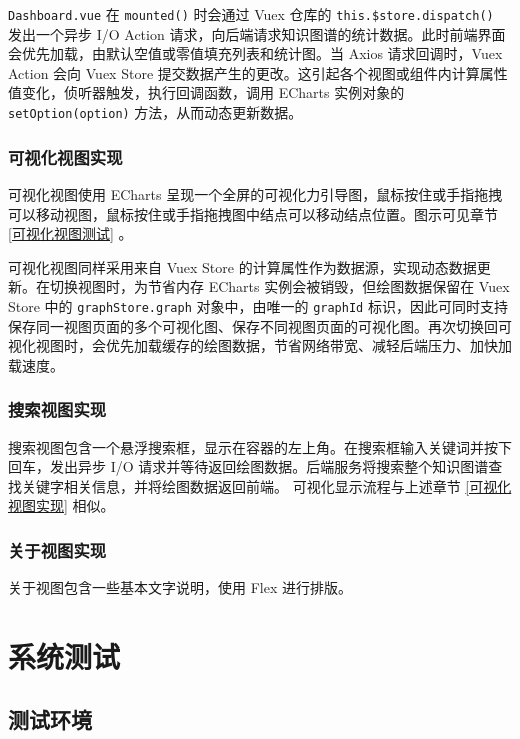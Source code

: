 \documentclass[a4paper,AutoFakeBold,oneside,12pt]{book}
\begin{document}
\lstinline|Dashboard.vue| 在 \lstinline|mounted()| 时会通过 Vuex 仓库的 \lstinline|this.$store.dispatch()| 发出一个异步 I/O Action 请求，向后端请求知识图谱的统计数据。此时前端界面会优先加载，由默认空值或零值填充列表和统计图。当 Axios 请求回调时，Vuex Action 会向 Vuex Store 提交数据产生的更改。这引起各个视图或组件内计算属性值变化，侦听器触发，执行回调函数，调用 ECharts 实例对象的 \lstinline|setOption(option)| 方法，从而动态更新数据。

\subsection{可视化视图实现\label{可视化视图实现}}

可视化视图使用 ECharts 呈现一个全屏的可视化力引导图，鼠标按住或手指拖拽可以移动视图，鼠标按住或手指拖拽图中结点可以移动结点位置。图示可见章节 \ref{可视化视图测试} 。

可视化视图同样采用来自 Vuex Store 的计算属性作为数据源，实现动态数据更新。在切换视图时，为节省内存 ECharts 实例会被销毁，但绘图数据保留在 Vuex Store 中的 \lstinline|graphStore.graph| 对象中，由唯一的 \lstinline|graphId| 标识，因此可同时支持保存同一视图页面的多个可视化图、保存不同视图页面的可视化图。再次切换回可视化视图时，会优先加载缓存的绘图数据，节省网络带宽、减轻后端压力、加快加载速度。

\subsection{搜索视图实现}

搜索视图包含一个悬浮搜索框，显示在容器的左上角。在搜索框输入关键词并按下回车，发出异步 I/O 请求并等待返回绘图数据。后端服务将搜索整个知识图谱查找关键字相关信息，并将绘图数据返回前端。 可视化显示流程与上述章节 \ref{可视化视图实现} 相似。

\subsection{关于视图实现}

关于视图包含一些基本文字说明，使用 Flex 进行排版。

\chapter{系统测试}

\section{测试环境}
\end{document}
